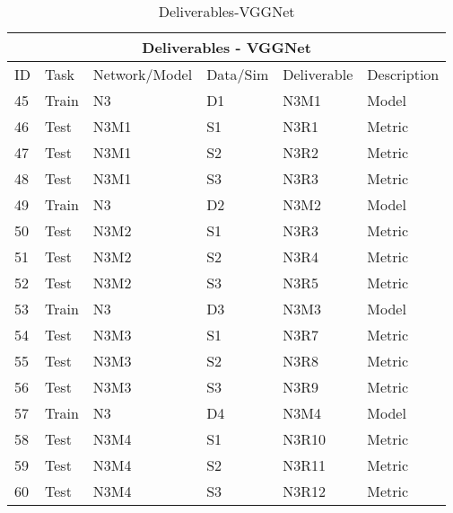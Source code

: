 \documentclass{article}
\begin{document}
\begin{table}[]
\begin{center}
\begin{tabular}{|l|l|l|l|l|l|}
\hline
\multicolumn{6}{|c|}{Deliverables - VGGNet} \\ \hline

ID & Task &  Network/Model & Data/Sim & Deliverable & Description \\ \hline\hline
45 & Train & N3 & D1 & N3M1 & Model \\ \hline
46 & Test & N3M1 & S1 & N3R1 & Metric \\ \hline
47 & Test & N3M1 & S2 & N3R2 & Metric \\ \hline
48 & Test & N3M1 & S3 & N3R3 & Metric \\ \hline\hline

49 & Train & N3 & D2 & N3M2 & Model \\ \hline
50 & Test & N3M2 & S1 & N3R3 & Metric \\ \hline
51 & Test & N3M2 & S2 & N3R4 & Metric \\ \hline
52 & Test & N3M2 & S3 & N3R5 & Metric \\ \hline\hline

53 & Train & N3 & D3 & N3M3 & Model \\ \hline
54 & Test & N3M3 & S1 & N3R7 & Metric \\ \hline
55 & Test & N3M3 & S2 & N3R8 & Metric \\ \hline
56 & Test & N3M3 & S3 & N3R9 & Metric \\ \hline\hline

57 & Train & N3 & D4 & N3M4 & Model \\ \hline
58 & Test & N3M4 & S1 & N3R10 & Metric \\ \hline
59 & Test & N3M4 & S2 & N3R11 & Metric \\ \hline
60 & Test & N3M4 & S3 & N3R12 & Metric \\ \hline 

\end{tabular}
\end{center}
\caption{Deliverables-VGGNet}
\label{Deliverables-VGGNet}
\end{table}


\end{document}

